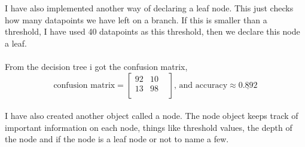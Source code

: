 \documentclass[12pt, letterpaper]{article}
\begin{document}
      I have also implemented another way of declaring a leaf node. This just checks how many datapoints we have left on a branch. If this is smaller than a threshold, I have used 40 datapoints as this threshold, then we declare this node a leaf.\\
      \\
      From the decision tree i got the confusion matrix,
      \[
        \text{confusion matrix} =
        \begin{bmatrix}
          92 & 10  & \\
          13 & 98 & \\
        \end{bmatrix}
        \text{, and accuracy} \approx \underline{0.892}
      \]\\
      I have also created another object called a node. The node object keeps track of important information on each node, things like threshold values, the depth of the node and if the node is a leaf node or not to name a few.
\end{document}
